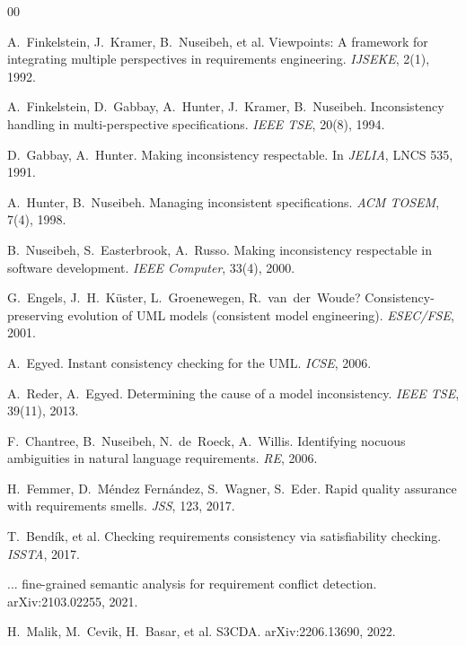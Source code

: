 \documentclass[10pt,twocolumn]{article}
\begin{document}
\begin{thebibliography}{00}

 A.~Finkelstein, J.~Kramer,
B.~Nuseibeh, et al. Viewpoints: A framework for integrating multiple
perspectives in requirements engineering. \emph{IJSEKE}, 2(1), 1992.

 A.~Finkelstein, D.~Gabbay,
A.~Hunter, J.~Kramer, B.~Nuseibeh. Inconsistency handling in
multi-perspective specifications. \emph{IEEE TSE}, 20(8), 1994.

 D.~Gabbay, A.~Hunter. Making
inconsistency respectable. In \emph{JELIA}, LNCS 535, 1991.

 A.~Hunter, B.~Nuseibeh. Managing
inconsistent specifications. \emph{ACM TOSEM}, 7(4), 1998.

 B.~Nuseibeh, S.~Easterbrook,
A.~Russo. Making inconsistency respectable in software development.
\emph{IEEE Computer}, 33(4), 2000.

 G.~Engels, J.~H.~K\"uster,
L.~Groenewegen, R.~van~der~Woude? Consistency-preserving evolution
of UML models (consistent model engineering). \emph{ESEC/FSE}, 2001.

 A.~Egyed. Instant consistency checking
for the UML. \emph{ICSE}, 2006.

 A.~Reder, A.~Egyed. Determining the
cause of a model inconsistency. \emph{IEEE TSE}, 39(11), 2013.

 F.~Chantree, B.~Nuseibeh,
N.~de~Roeck, A.~Willis. Identifying nocuous ambiguities in natural
language requirements. \emph{RE}, 2006.

 H.~Femmer, D.~M\'endez Fern\'andez,
S.~Wagner, S.~Eder. Rapid quality assurance with requirements
smells. \emph{JSS}, 123, 2017.

 T.~Bend\'ik, et al. Checking
requirements consistency via satisfiability checking. \emph{ISSTA},
2017.

 ... fine-grained semantic analysis for
requirement conflict detection. arXiv:2103.02255, 2021.

 H.~Malik, M.~Cevik, H.~Basar, et al.
S3CDA. arXiv:2206.13690, 2022.


\end{thebibliography}
\end{document}
